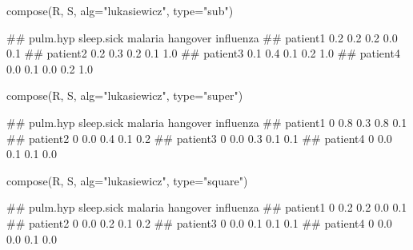 \begin{Schunk}
% --begin: "comp.subsupsquare"
\begin{Sinput}
compose(R, S, alg="lukasiewicz", type="sub")
\end{Sinput}
\begin{Soutput}
##          pulm.hyp sleep.sick malaria hangover influenza
## patient1      0.2        0.2     0.2      0.0       0.1
## patient2      0.2        0.3     0.2      0.1       1.0
## patient3      0.1        0.4     0.1      0.2       1.0
## patient4      0.0        0.1     0.0      0.2       1.0
\end{Soutput}
\begin{Sinput}
compose(R, S, alg="lukasiewicz", type="super")
\end{Sinput}
\begin{Soutput}
##          pulm.hyp sleep.sick malaria hangover influenza
## patient1        0        0.8     0.3      0.8       0.1
## patient2        0        0.0     0.4      0.1       0.2
## patient3        0        0.0     0.3      0.1       0.1
## patient4        0        0.0     0.1      0.1       0.0
\end{Soutput}
\begin{Sinput}
compose(R, S, alg="lukasiewicz", type="square")
\end{Sinput}
\begin{Soutput}
##          pulm.hyp sleep.sick malaria hangover influenza
## patient1        0        0.2     0.2      0.0       0.1
## patient2        0        0.0     0.2      0.1       0.2
## patient3        0        0.0     0.1      0.1       0.1
## patient4        0        0.0     0.0      0.1       0.0
\end{Soutput}
%
% --end: "comp.subsupsquare"
\end{Schunk}
